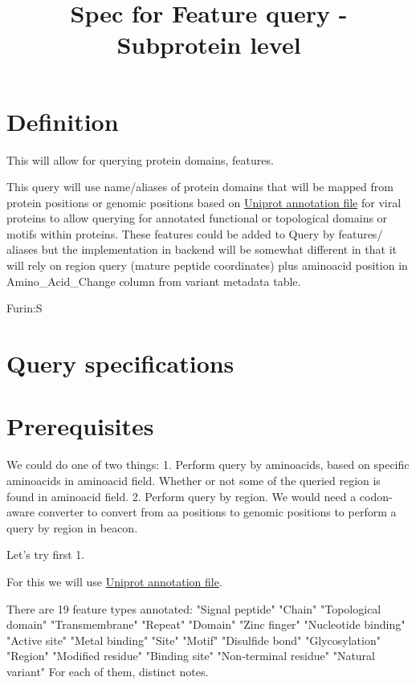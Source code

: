 \documentclass[a4paper, 10pt]{article}
\title{Spec for Feature query - Subprotein level}
\begin{document}
\date{}
\maketitle




\section{Definition}
This will allow for querying protein domains, features. 

This query will use name/aliases of protein domains that will be mapped from protein positions or genomic positions based on \href{https://github.com/clauw87/virusbeacon/blob/raw_ideas/uniprot-2697049.gff}{Uniprot annotation file} for viral proteins to allow querying for annotated functional or topological domains or motifs within proteins. These features could be added to Query by features/ aliases but the implementation in backend will be somewhat different in that it will rely on region query (mature peptide coordinates) plus aminoacid position in Amino_Acid_Change column from variant metadata table.


Furin:S 

\section{Query specifications}


\section{Prerequisites}
We could do one of two things:
1. Perform query by aminoacids, based on specific aminoacids in aminoacid field. Whether or not some of the queried region is found in aminoacid field.
2. Perform query by region. We would need a codon-aware converter to convert from aa positions to genomic positions to perform a query by region in beacon.

Let's try first 1.

For this we will use \href{https://github.com/clauw87/virusbeacon/blob/raw_ideas/uniprot-2697049.gff}{Uniprot annotation file}.

There are 19 feature types annotated:  "Signal peptide"       "Chain"                "Topological domain"   "Transmembrane"        "Repeat"               "Domain"               "Zinc finger"          "Nucleotide binding"   "Active site"          "Metal binding"        "Site"                 "Motif"                "Disulfide bond"       "Glycosylation"        "Region"               "Modified residue"    
"Binding site"         "Non-terminal residue" "Natural variant"  
For each of them, distinct notes.
\end{document}
